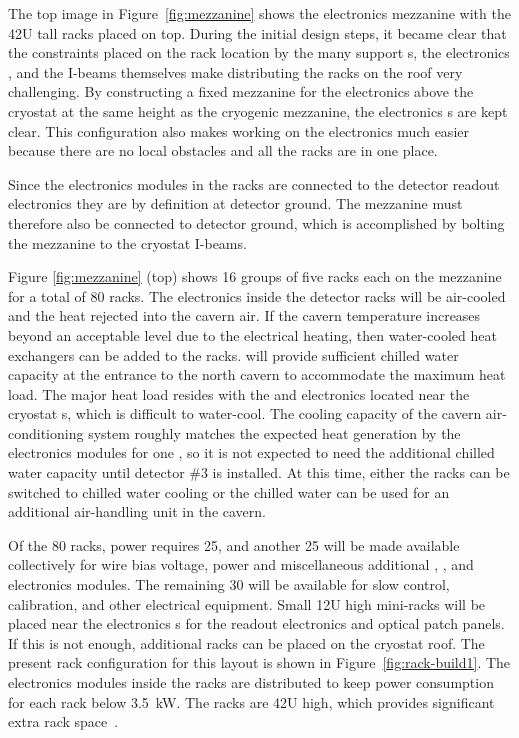 The top image in Figure~\ref{fig:mezzanine} shows the  electronics mezzanine with the 42U tall racks placed on top. 
During the initial design steps, it became clear that the constraints placed on the rack location by the many  support \fdth{}s, the electronics \fdth, and the I-beams themselves make distributing the racks on the roof very challenging. 
By constructing a fixed mezzanine for the electronics above the cryostat at the same height as the cryogenic mezzanine, the electronics \fdth{}s are kept clear. 
This configuration also makes working on the electronics much easier because there are no local obstacles and all the racks are in one place.

Since the electronics modules in the  racks are connected to the detector readout electronics they are by definition at detector ground. The mezzanine must therefore also be connected to detector ground, which is accomplished by bolting the mezzanine to the cryostat I-beams. 
 
Figure \ref{fig:mezzanine} (top) shows 16 groups of five racks each
on the mezzanine for a total of 80 racks. 
The electronics inside the detector racks will be air-cooled and the heat rejected into the cavern air. 
If the cavern temperature increases beyond an acceptable level due to the electrical heating, then water-cooled heat exchangers can be added to the racks.  will provide sufficient chilled water capacity at the entrance to the north cavern to accommodate the maximum heat load. 
The major heat load resides with the  and  electronics located near the cryostat \fdth{}s, which is difficult to water-cool. 
The cooling capacity of the cavern air-conditioning system roughly matches the expected heat generation by the electronics modules for one , so it is not expected to need the additional chilled water capacity until detector \#3 is installed. 
At this time, either the racks can be switched to chilled water cooling or the chilled water can be used for an additional air-handling unit in the cavern.


Of the 80 racks,   power requires \num{25}, and another 25 will be made available collectively for   wire bias voltage,  power and miscellaneous additional , , and   electronics modules. 
The remaining 30 will be available for slow control, calibration, and other electrical equipment. 
Small 12U high mini-racks will  be placed near the electronics \fdth{}s for the  readout electronics and optical patch panels. If this is not enough, additional racks can be placed on the cryostat roof. The present rack configuration for this layout is shown in Figure~\ref{fig:rack-build1}. 
The electronics modules inside the racks are distributed to keep power consumption for each rack below \SI{3.5}{kW}. 
The racks are 42U high, which provides significant extra rack space~\cite{bib:docdb4499}.  


